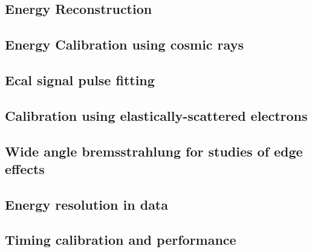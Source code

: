 \documentclass[12pt]{report}
\begin{document}
\subsection{Energy Reconstruction}


\subsection{Energy Calibration using cosmic rays}


\subsection{Ecal signal pulse fitting} \label{pulsefitting}


\subsection{Calibration using elastically-scattered electrons}


\subsection{Wide angle bremsstrahlung for studies of edge effects}


\subsection{Energy resolution in data}


\subsection{Timing calibration and performance}


\end{document}

